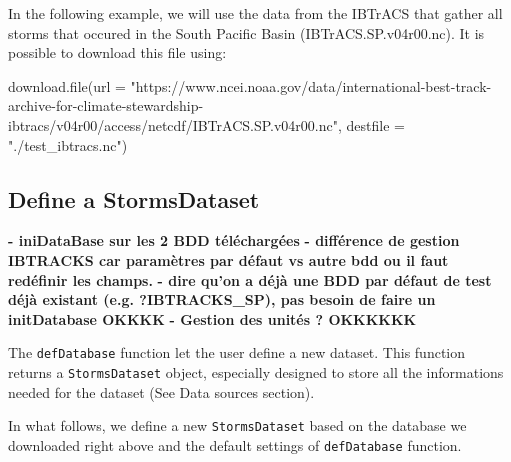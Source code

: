 \documentclass[
]{article}
\newenvironment{Shaded}{\begin{snugshade}}{\end{snugshade}}
\newcommand{\AttributeTok}[1]{\textcolor[rgb]{0.77,0.63,0.00}{#1}}
\newcommand{\FunctionTok}[1]{\textcolor[rgb]{0.00,0.00,0.00}{#1}}
\newcommand{\NormalTok}[1]{#1}
\newcommand{\StringTok}[1]{\textcolor[rgb]{0.31,0.60,0.02}{#1}}
\begin{document}
In the following example, we will use the data from the IBTrACS that
gather all storms that occured in the South Pacific Basin
(IBTrACS.SP.v04r00.nc). It is possible to download this file using:

\begin{Shaded}
\begin{Highlighting}[]
\FunctionTok{download.file}\NormalTok{(}\AttributeTok{url =} \StringTok{"https://www.ncei.noaa.gov/data/international{-}best{-}track{-}archive{-}for{-}climate{-}stewardship{-}ibtracs/v04r00/access/netcdf/IBTrACS.SP.v04r00.nc"}\NormalTok{,}
              \AttributeTok{destfile =} \StringTok{"./test\_ibtracs.nc"}\NormalTok{)}
\end{Highlighting}
\end{Shaded}

\hypertarget{define-a-stormsdataset}{%
\subsection{Define a StormsDataset}\label{define-a-stormsdataset}}

\textbf{- iniDataBase sur les 2 BDD téléchargées}
\textbf{- différence de gestion IBTRACKS car paramètres par défaut vs autre bdd ou il faut redéfinir les champs.}
\textbf{- dire qu'on a déjà une BDD par défaut de test déjà existant (e.g. ?IBTRACKS\_SP), pas besoin de faire un initDatabase OKKKK}
\textbf{- Gestion des unités ? OKKKKKK}

The \texttt{defDatabase} function let the user define a new dataset.
This function returns a \texttt{StormsDataset} object, especially
designed to store all the informations needed for the dataset (See Data
sources section).

In what follows, we define a new \texttt{StormsDataset} based on the
database we downloaded right above and the default settings of
\texttt{defDatabase} function.
\end{document}
